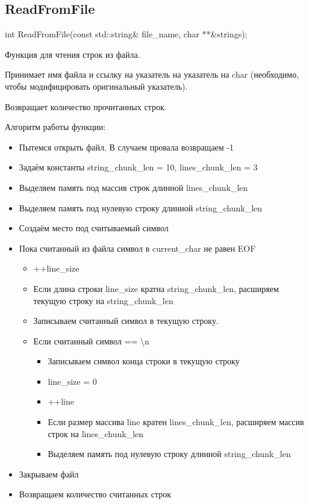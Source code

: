 \documentclass[12pt,a4paper]{article}  %
\begin{document}
	\subsection*{ReadFromFile}
	int ReadFromFile(const std::string\& file\_name, char **\&strings);
	
	Функция для чтения строк из файла. 
	
	Принимает имя файла и ссылку на указатель на указатель на char (необходимо, чтобы модифицировать оригинальный указатель). 
	
	Возвращает количество прочитанных строк.
	
	Алгоритм работы функции:
	
	\begin{itemize}
		\item Пытемся открыть файл. В случаем провала возвращаем -1
		\item Задаём константы string\_chunk\_len = 10, lines\_chunk\_len = 3
		\item Выделяем память под массив строк длинной lines\_chunk\_len
		\item Выделяем память под нулевую строку длинной string\_chunk\_len
		\item Создаём место под считываемый символ
		\item Пока считанный из файла символ в current\_char не равен EOF
		\begin{itemize}
			\item ++line\_size
			\item Если длина строки line\_size кратна string\_chunk\_len, расширяем текущую строку на string\_chunk\_len
			\item Записываем считанный символ в текущую строку.
			\item Если считанный символ == \textbackslash n
			\begin{itemize}
				\item Записываем символ конца строки в текущую строку
				\item line\_size = 0
				\item ++line
				\item Если размер массива line кратен lines\_chunk\_len, расширяем массив строк на lines\_chunk\_len
				\item Выделяем память под нулевую строку длинной string\_chunk\_len
			\end{itemize}
		\end{itemize}
		\item Закрываем файл
		\item Возвращаем количество считанных строк
	\end{itemize}
	
\end{document}
